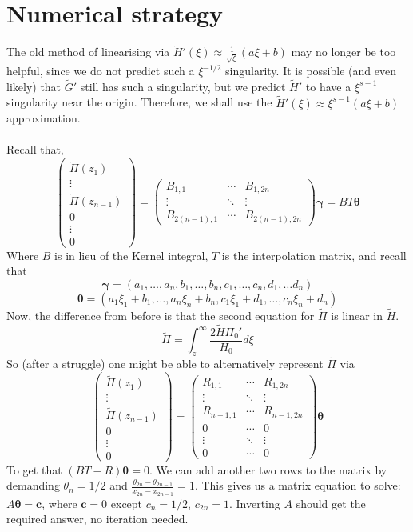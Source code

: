 \documentclass{article}
\newcommand{\bs}{\boldsymbol}                               %
\begin{document}
\section{Numerical strategy}
The old method of linearising via $\tilde{H}'(\xi) \approx 
\frac{1}{\sqrt{\xi}}(a\xi+b)$ may no longer be too helpful, since we do not 
predict such a $\xi^{-1/2}$ singularity. It is possible (and even likely) 
that $\tilde{G}'$ still has such a singularity, but we predict $\tilde{H}'$ 
to have a $\xi^{s-1}$ singularity near the origin. Therefore, we shall use
the $\tilde{H}'(\xi) \approx \xi^{s-1}(a\xi+b)$ 
approximation.
\\
\\
Recall that,
\[ \left( \begin{array}{c} \tilde{\Pi}(z_1) \\ \vdots \\ \tilde{\Pi}(z_{n-1}) 
\\[4pt] 0 \\ \vdots \\ 0 \end{array} \right) =
\left( \begin{array}{ccc} B_{1,1} & \cdots & B_{1 , 2n} \\
\vdots & \ddots & \vdots \\ B_{2(n-1),1} & \cdots & B_{2(n-1) , 2n} 
\end{array}
\right) \bs{\gamma} = BT\bs{\theta} \]
Where $B$ is in lieu of the Kernel integral, $T$ is the interpolation matrix,
and recall that 
\[ \bs{\gamma} = (a_1, \dots, a_n, b_1, \dots , b_n, c_1, \dots, c_n, d_1, \dots 
 d_n) \]
\[ \bs{\theta} = (a_1\xi_1+b_1, \dots, a_n\xi_n+b_n, c_1\xi_1+d_1, \dots,
 c_n \xi_n +  d_n) \]
Now, the difference from before is that the second equation for $\tilde{\Pi}$ 
is linear in $\tilde{H}$. 
\[ \tilde{\Pi} = \int_z^{\infty} \frac{2 \tilde{H} \Pi_0'}{H_0} d\xi \]
So (after a struggle) one might be able to alternatively represent 
$\tilde{\Pi}$ via 
\[ \left( \begin{array}{c} \tilde{\Pi}(z_1) \\ \vdots \\ \tilde{\Pi}(z_{n-1}) 
\\[4pt] 0 \\ \vdots \\ 0 \end{array} \right) =
\left( \begin{array}{ccc} R_{1,1} & \cdots & R_{1 , 2n} \\
\vdots & \ddots & \vdots \\ R_{n-1,1} & \cdots & R_{n-1 , 2n} 
\\ 0 & \cdots & 0  \\
\vdots & \ddots & \vdots \\ 0 & \cdots & 0 
\end{array} \right) \bs{\theta} \]
To get that $(BT-R)\bs{\theta} = 0$. We can add another two rows to the
matrix by demanding $\theta_n=1/2$ and 
$\displaystyle \frac{\theta_{2n}-\theta_{2n-1}}{x_{2n}- x_{2n-1}}=1$.
This gives us a matrix equation to solve: $A \bs{\theta} = \bs{c}$, where
$\bs{c}=0$ except $c_n=1/2$, $c_{2n}=1$. Inverting $A$ should get the 
required answer, no iteration needed.
\end{document}
